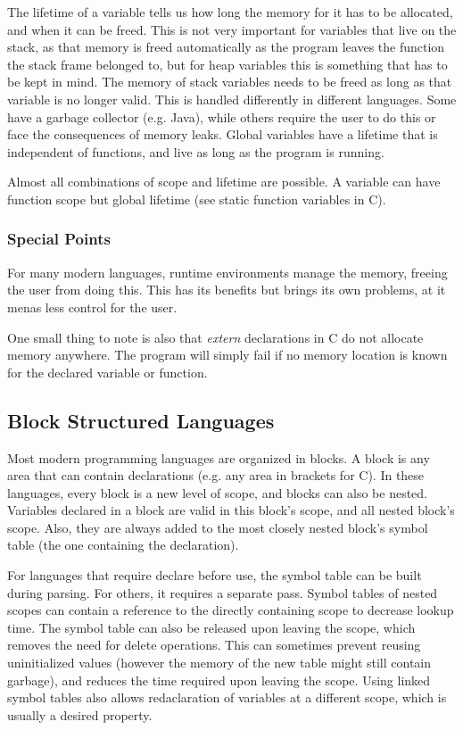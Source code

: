 \documentclass{article}
\begin{document}
The lifetime of a variable tells us how long the memory for it has to be allocated, and when it can be freed.
This is not very important for variables that live on the stack, as that memory is freed automatically as the program leaves the function the stack frame belonged to, but for heap variables this is something that has to be kept in mind.
The memory of stack variables needs to be freed as long as that variable is no longer valid.
This is handled differently in different languages.
Some have a garbage collector (e.g. Java), while others require the user to do this or face the consequences of memory leaks.
Global variables have a lifetime that is independent of functions, and live as long as the program is running.
\begin{keypointbox}
	Almost all combinations of scope and lifetime are possible.
	A variable can have function scope but global lifetime (see static function variables in C).
\end{keypointbox}

\subsubsection{Special Points}
For many modern languages, runtime environments manage the memory, freeing the user from doing this.
This has its benefits but brings its own problems, at it menas less control for the user.

One small thing to note is also that \emph{extern} declarations in C do not allocate memory anywhere.
The program will simply fail if no memory location is known for the declared variable or function.

\subsection{Block Structured Languages}
Most modern programming languages are organized in blocks.
A block is any area that can contain declarations (e.g. any area in brackets for C).
In these languages, every block is a new level of scope, and blocks can also be nested.
Variables declared in a block are valid in this block's scope, and all nested block's scope.
Also, they are always added to the most closely nested block's symbol table (the one containing the declaration).

For languages that require declare before use, the symbol table can be built during parsing.
For others, it requires a separate pass.
Symbol tables of nested scopes can contain a reference to the directly containing scope to decrease lookup time.
The symbol table can also be released upon leaving the scope, which removes the need for delete operations.
This can sometimes prevent reusing uninitialized values (however the memory of the new table might still contain garbage), and reduces the time required upon leaving the scope.
Using linked symbol tables also allows redaclaration of variables at a different scope, which is usually a desired property.
\end{document}
